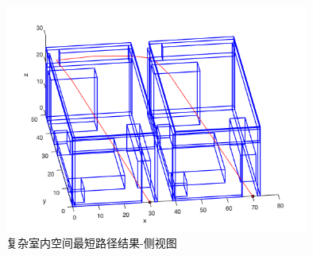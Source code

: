 \begin{figure}[!htb]
    \centering
    \includegraphics[width=10cm]{figures/test_complex_situation_out_lean.png}
    \caption{复杂室内空间最短路径结果-侧视图}
    \label{fig:test_complex_situation_out_lean}
\end{figure}

\FloatBarrier
